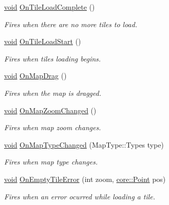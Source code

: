 \begin{DoxyCompactItemize}
\hyperlink{group___u_a_v_objects_plugin_ga444cf2ff3f0ecbe028adce838d373f5c}{void} \hyperlink{group___o_p_map_widget_ga5cffbc0b6973aa0d25c7a8e3cb9a10bd}{\-On\-Tile\-Load\-Complete} ()
\begin{DoxyCompactList}\small\item\em \-Fires when there are no more tiles to load. \end{DoxyCompactList}\item 
\hyperlink{group___u_a_v_objects_plugin_ga444cf2ff3f0ecbe028adce838d373f5c}{void} \hyperlink{group___o_p_map_widget_gab28c7ce093c06e3dd06d7981fa34abde}{\-On\-Tile\-Load\-Start} ()
\begin{DoxyCompactList}\small\item\em \-Fires when tiles loading begins. \end{DoxyCompactList}\item 
\hyperlink{group___u_a_v_objects_plugin_ga444cf2ff3f0ecbe028adce838d373f5c}{void} \hyperlink{group___o_p_map_widget_ga0985006355718a5c61bfd02c70e6b0aa}{\-On\-Map\-Drag} ()
\begin{DoxyCompactList}\small\item\em \-Fires when the map is dragged. \end{DoxyCompactList}\item 
\hyperlink{group___u_a_v_objects_plugin_ga444cf2ff3f0ecbe028adce838d373f5c}{void} \hyperlink{group___o_p_map_widget_ga6cff965989ae7d23b98d5345c3912492}{\-On\-Map\-Zoom\-Changed} ()
\begin{DoxyCompactList}\small\item\em \-Fires when map zoom changes. \end{DoxyCompactList}\item 
\hyperlink{group___u_a_v_objects_plugin_ga444cf2ff3f0ecbe028adce838d373f5c}{void} \hyperlink{group___o_p_map_widget_gad0bd8494b0fba444bad76bcf3c1bdb0a}{\-On\-Map\-Type\-Changed} (\-Map\-Type\-::\-Types type)
\begin{DoxyCompactList}\small\item\em \-Fires when map type changes. \end{DoxyCompactList}\item 
\hyperlink{group___u_a_v_objects_plugin_ga444cf2ff3f0ecbe028adce838d373f5c}{void} \hyperlink{group___o_p_map_widget_gad393b8af8f879239faaa466bbc33f4b7}{\-On\-Empty\-Tile\-Error} (int zoom, \hyperlink{structcore_1_1_point}{core\-::\-Point} pos)
\begin{DoxyCompactList}\small\item\em \-Fires when an error ocurred while loading a tile. \end{DoxyCompactList}\item 

\end{DoxyCompactItemize}

